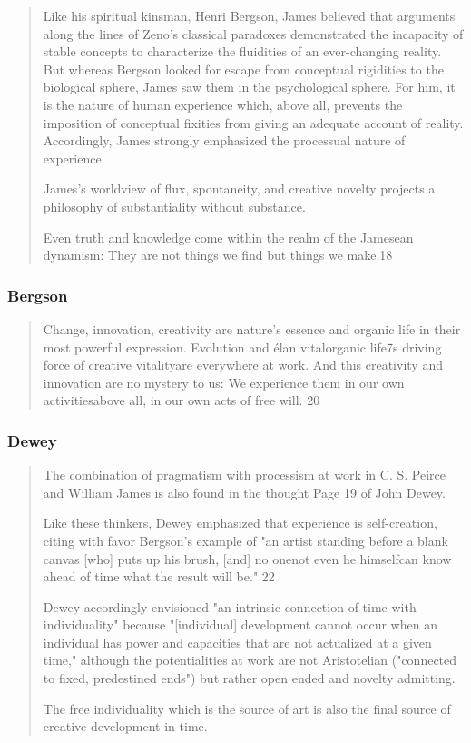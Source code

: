 \documentclass[a4paper]{Thesis}
\begin{document}
\begin{quotation}
	Like his spiritual kinsman, Henri Bergson, James believed that arguments along the lines
	of Zeno's classical paradoxes demonstrated the incapacity of stable concepts to
	characterize the fluidities of an ever-changing reality. But whereas Bergson looked for
	escape from conceptual rigidities
	to the biological sphere, James saw them in the psychological sphere. For him, it is the
	nature of human experience which, above all, prevents the imposition of conceptual
	fixities from giving an adequate account of reality. Accordingly, James strongly
	emphasized the processual nature of experience
	
	James's worldview of flux, spontaneity, and creative novelty projects a philosophy of
	substantiality without substance.
	
	Even truth and knowledge come within the
	realm of the Jamesean dynamism: They are not things we find but things we make.18
\end{quotation}


\subsubsection{Bergson}
\begin{quotation}
	Change, innovation, creativity are nature's essence and
	organic life in their most powerful expression. Evolution and élan vitalorganic life7s
	driving force of creative vitalityare everywhere at work. And this creativity and innovation
	are no mystery to us: We experience them in our own activitiesabove all, in our own acts
	of free will. 20
\end{quotation}

\subsubsection{Dewey}
\begin{quotation}
	The combination of pragmatism with processism at work in C. S. Peirce and William
	James is also found in the thought
	Page 19
	of John Dewey.
	
	Like these thinkers, Dewey emphasized that experience is self-creation, citing with favor
	Bergson's example of "an artist standing before a blank canvas [who] puts up his brush,
	[and] no onenot even he himselfcan know ahead of time what the result will be." 22
	
	Dewey accordingly envisioned "an intrinsic connection of time with individuality" because
	"[individual] development cannot occur when an individual has power and capacities that
	are not actualized at a given time," although the potentialities at work are not
	Aristotelian ("connected to fixed, predestined ends") but rather open ended and novelty
	admitting.
	
	The free individuality which is the source of art is also the final
	source of creative development in time.
\end{quotation}
\end{document}
